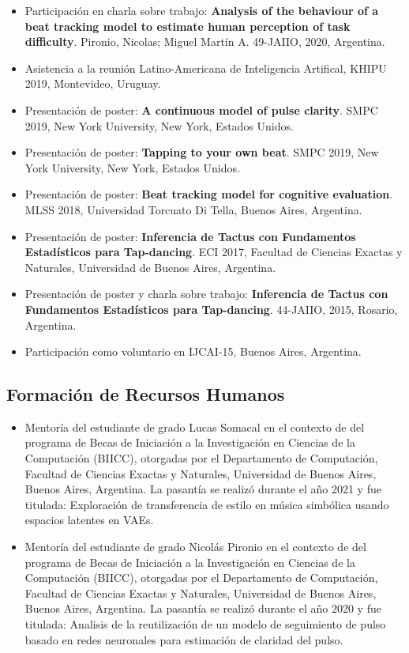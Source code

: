 \documentclass[a4paper,10pt]{article}
\begin{document}
\begin{itemize}
    \item Participación en charla sobre trabajo:
\textbf{Analysis of the behaviour of a beat tracking model to estimate human
        perception of task difficulty}. Pironio, Nicolas; Miguel Martín A. 49-JAIIO, 2020, Argentina.
    \item Asistencia a la reunión Latino-Americana de Inteligencia Artifical,
        KHIPU 2019, Montevideo, Uruguay.
    \item Presentación de poster:
        \textbf{A continuous model of pulse clarity}.
        SMPC 2019, New York University, New York, Estados Unidos.
    \item Presentación de poster:
        \textbf{Tapping to your own beat}.
        SMPC 2019, New York University, New York, Estados Unidos.
    \item Presentación de poster:
        \textbf{Beat tracking model for cognitive evaluation}.
        MLSS 2018, Universidad Torcuato Di Tella, Buenos Aires, Argentina.
    \item Presentación de poster: \textbf{Inferencia de Tactus con Fundamentos Estadísticos para
Tap-dancing}.
    ECI 2017, Facultad de Ciencias Exactas y Naturales, Universidad de Buenos
        Aires, Argentina.
    \item Presentación de poster y charla sobre trabajo:
\textbf{Inferencia de Tactus con Fundamentos Estadísticos para
        Tap-dancing}. 44-JAIIO, 2015, Rosario, Argentina.
    \item Participación como voluntario en IJCAI-15, Buenos Aires, Argentina.
\end{itemize}

\subsection{Formación de Recursos Humanos}

\begin{itemize}
\item Mentoría del estudiante de grado Lucas Somacal en el contexto de 
del programa de Becas de Iniciación a la Investigación en Ciencias de la
Computación (BIICC), otorgadas por el Departamento de Computación, Facultad
de Ciencias Exactas y Naturales, Universidad de Buenos Aires, Buenos Aires,
  Argentina. La pasantía se realizó durante el año 2021
y fue titulada: Exploración
de transferencia de estilo en música simbólica usando espacios latentes en
  VAEs.

\item
Mentoría del estudiante de grado Nicolás Pironio en el contexto de 
del programa de Becas de Iniciación a la Investigación en Ciencias de la
Computación (BIICC), otorgadas por el Departamento de Computación, Facultad
de Ciencias Exactas y Naturales, Universidad de Buenos Aires, Buenos Aires,
  Argentina. La pasantía se realizó durante el año 2020
y fue titulada: Analisis de la reutilización de un modelo de seguimiento de
pulso basado en redes neuronales para estimación de claridad del pulso.
\end{itemize}
\end{document}
